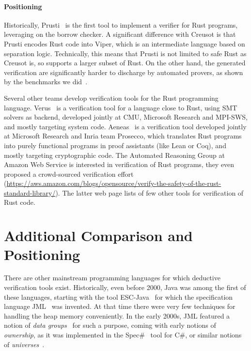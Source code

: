 \documentclass[a4paper,11pt]{article}
\begin{document}
\paragraph{Positioning}

Historically, Prusti~\cite{astrauskas19oopsla} is the first tool to implement a
verifier for Rust programs, leveraging on the borrow checker. A significant
difference with Creusot is that Prusti encodes Rust code into Viper, which is an
intermediate language based on separation logic. Technically, this means that
Prusti is not limited to safe Rust as Creusot is, so supports a larger subset of
Rust. On the other hand, the generated verification are significantly harder to
discharge by automated provers, as shown by the benchmarks we
did~\cite{denis23phd}.

Several other teams develop verification tools for the Rust programming
language.  Verus~\cite{lattuada23oopsla} is a verification tool for a language
close to Rust, using SMT solvers as backend, developed jointly at CMU, Microsoft
Research and MPI-SWS, and mostly targeting system code.  Aeneas~\cite{ho22icfp}
is a verification tool developed jointly at Microsoft Research and Inria team
Prosecco, which translates Rust programs into purely functional programs in
proof assistants (like Lean or Coq), and mostly targeting cryptographic
code. The Automated Reasoning Group at Amazon Web Service is interested in
verification of Rust programs, they even proposed a crowd-sourced verification
effort
(\url{https://aws.amazon.com/blogs/opensource/verify-the-safety-of-the-rust-standard-library/}). The
latter web page lists of few other tools for verification of Rust code.


\section{Additional Comparison and Positioning}
\label{sec:related}


There are other mainstream programming languages for which deductive
verification tools exist. Historically, even before 2000, Java was among the
first of these languages, starting with the tool ESC-Java~\cite{escjava98} for
which the specification language JML~\cite{Burdy04} was invented. At that time
there were very few techniques for handling the heap memory conveniently. In the
early 2000s, JML featured a notion of \emph{data groups}~\cite{breunesse03ftfjp}
for such a purpose, coming with early notions of \emph{ownership}, as it was
implemented in the Spec\#~\cite{BarnettLS04} tool for C\#, or similar notions of
\emph{universes}~\cite{Dietl05jot}.
\end{document}

